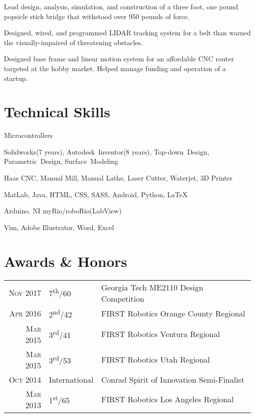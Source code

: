 \documentclass{resume}
\begin{document}
Lead design, analysis, simulation, and construction of a three foot, one pound popsicle stick bridge that withstood over 950 pounds of force.


Designed, wired, and programmed LIDAR tracking system for a belt than warned the visually-impaired of threatening obstacles.

Designed base frame and linear motion system for an affordable CNC router targeted at the hobby market. Helped manage funding and operation of a startup.

\section{Technical Skills}
\begin{skills}{Microcontrollers}
  \item [CAD] Solidworks(7 years), Autodesk~Inventor(8 years), Top-down~Design, Parametric~Design, Surface~Modeling
  \item [Manufacturing] Haas CNC, Manual Mill, Manual Lathe, Laser Cutter, Waterjet, 3D Printer
  \item [Programming] MatLab, Java, HTML, CSS, SASS, Android, Python, \LaTeX
  \item [Microcontrollers] Arduino, NI myRio/roboRio(LabView)
  \item [Software] Vim, Adobe Illustrator, Word, Excel
\end{skills}

\section{Awards \& Honors}
\begin{tabular}{rll}
  \textsc{Nov} 2017 & 7\textsuperscript{th}/60 & Georgia Tech ME2110 Design Competition\\
  \textsc{Apr} 2016 & 2\textsuperscript{nd}/42 & FIRST Robotics Orange County Regional\\
  \textsc{Mar} 2015 & 3\textsuperscript{rd}/41 & FIRST Robotics Ventura Regional\\
  \textsc{Mar} 2015 & 3\textsuperscript{rd}/53 & FIRST Robotics Utah Regional\\
  \textsc{Oct} 2014 & International & Conrad Spirit of Innovation Semi-Finalist\\
  \textsc{Mar} 2013 & 1\textsuperscript{st}/65 & FIRST Robotics Los Angeles Regional\\
\end{tabular}
\end{document}
